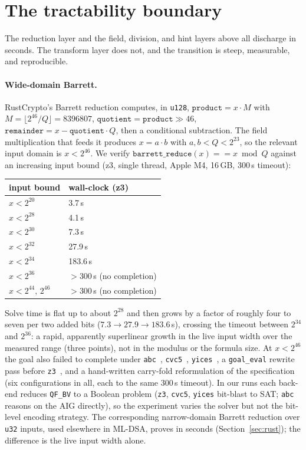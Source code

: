 \documentclass[journal=tches,submission,review]{iacrtrans}
\newcommand{\code}[1]{\texttt{#1}}
\begin{document}
\section{The tractability boundary}\label{sec:boundary}

The reduction layer and the field, division, and hint layers above all discharge in seconds. The
transform layer does not, and the transition is steep, measurable, and reproducible.

\paragraph{Wide-domain Barrett.} RustCrypto's Barrett reduction computes, in \code{u128},
$\code{product} = x \cdot M$ with $M = \lfloor 2^{46}/Q \rfloor = 8396807$, $\code{quotient} =
\code{product} \gg 46$, $\code{remainder} = x - \code{quotient} \cdot Q$, then a conditional subtraction.
The field multiplication that feeds it produces $x = a \cdot b$ with $a, b < Q < 2^{23}$, so the relevant
input domain is $x < 2^{46}$. We verify $\code{barrett\_reduce}(x) == x \bmod Q$ against an increasing
input bound (z3, single thread, Apple M4, 16\,GB, 300\,s timeout):
\begin{center}
\begin{tabular}{ll}
\hline
input bound & wall-clock (z3) \\
\hline
$x < 2^{20}$ & 3.7\,s \\
$x < 2^{28}$ & 4.1\,s \\
$x < 2^{30}$ & 7.3\,s \\
$x < 2^{32}$ & 27.9\,s \\
$x < 2^{34}$ & 183.6\,s \\
$x < 2^{36}$ & $>300$\,s (no completion) \\
$x < 2^{44},\, 2^{46}$ & $>300$\,s (no completion) \\
\hline
\end{tabular}
\end{center}
Solve time is flat up to about $2^{28}$ and then grows by a factor of roughly four to seven per two
added bits ($7.3 \to 27.9 \to 183.6$\,s), crossing the timeout between $2^{34}$ and $2^{36}$: a rapid,
apparently superlinear growth in the live input width over the measured range (three points), not in the
modulus or the formula size. At $x < 2^{46}$ the goal also failed to
complete under \code{abc}~\cite{abc}, \code{cvc5}~\cite{cvc5}, \code{yices}~\cite{yices}, a
\code{goal\_eval} rewrite pass before \code{z3}~\cite{z3}, and a hand-written carry-fold reformulation of
the specification (six configurations in all, each to the
same 300\,s timeout). In our runs each back-end reduces \code{QF\_BV} to a Boolean problem (\code{z3},
\code{cvc5}, \code{yices} bit-blast to SAT; \code{abc} reasons on the AIG directly), so the experiment
varies the solver but not the bit-level encoding strategy. The corresponding narrow-domain Barrett reduction over
\code{u32} inputs, used elsewhere in ML-DSA, proves in seconds (Section~\ref{sec:rust}); the difference is
the live input width alone.
\end{document}
